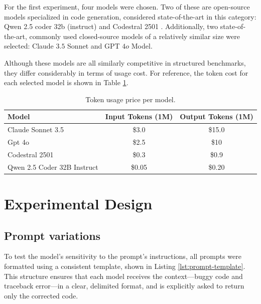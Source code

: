 

For the first experiment, four models were chosen. Two of these are open-source models specialized in code generation, considered state-of-the-art in this category: Qwen 2.5 coder 32b (instruct) \cite{hui2024qwen25codertechnicalreport} and Codestral 2501 \cite{Codestral_202501}. Additionally, two state-of-the-art, commonly used closed-source models of a relatively similar size were selected: Claude $3.5$ Sonnet and GPT $4o$ Model.

Although these models are all similarly competitive in structured benchmarks, they differ considerably in terms of usage cost. For reference, the token cost for each selected model is shown in Table \ref{tab:model-tokens}.
\begin{table}[h!]
\centering
\caption{Token usage price per model.}
\label{tab:model-tokens}
\begin{tabular}{|l|c|c|}
\hline
\textbf{Model} & \textbf{Input Tokens (1M)} & \textbf{Output Tokens (1M)} \\ \hline
Claude Sonnet 3.5 & \$3.0 & \$15.0 \\ \hline
Gpt 4o & \$2.5 & \$10 \\ \hline
Codestral 2501 & \$0.3 & \$0.9 \\ \hline
Qwen 2.5 Coder 32B Instruct & \$0.05 & \$0.20 \\ \hline
\end{tabular}
\end{table}


\section{Experimental Design}
\subsection{Prompt variations}

To test the model's sensitivity to the prompt's instructions, all prompts were formatted 
using a consistent template, shown in Listing \ref{lst:prompt-template}. This structure ensures 
that each model receives the context—buggy code and traceback error—in a clear, delimited 
format, and is explicitly asked to return only the corrected code.

